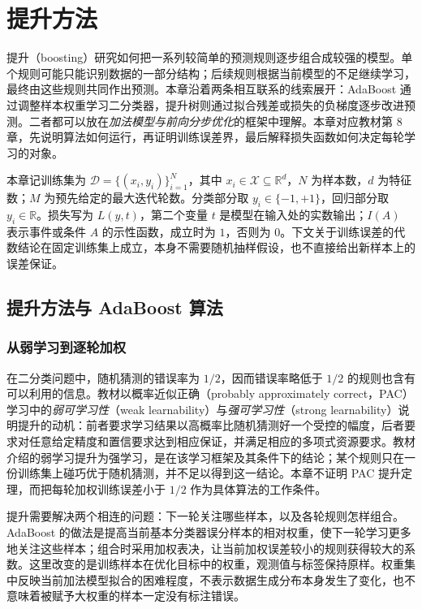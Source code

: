 \setcounter{chapter}{7} %
\chapter{提升方法}
\label{chap:lh-boosting}

提升（boosting）研究如何把一系列较简单的预测规则逐步组合成较强的模型。单个规则可能只能识别数据的一部分结构；后续规则根据当前模型的不足继续学习，最终由这些规则共同作出预测。本章沿着两条相互联系的线索展开：AdaBoost 通过调整样本权重学习二分类器，提升树则通过拟合残差或损失的负梯度逐步改进预测。二者都可以放在\emph{加法模型与前向分步优化}的框架中理解。本章对应教材第 8 章，先说明算法如何运行，再证明训练误差界，最后解释损失函数如何决定每轮学习的对象。

本章记训练集为 $\mathcal D=\{(x_i,y_i)\}_{i=1}^{N}$，其中 $x_i\in\mathcal X\subseteq\mathbb R^d$，$N$ 为样本数，$d$ 为特征数；$M$ 为预先给定的最大迭代轮数。分类部分取 $y_i\in\{-1,+1\}$，回归部分取 $y_i\in\mathbb R$。损失写为 $L(y,t)$，第二个变量 $t$ 是模型在输入处的实数输出；$I(A)$ 表示事件或条件 $A$ 的示性函数，成立时为 $1$，否则为 $0$。下文关于训练误差的代数结论在固定训练集上成立，本身不需要随机抽样假设，也不直接给出新样本上的误差保证。

\section{提升方法与 AdaBoost 算法}
\label{sec:lh-boost-adaboost}

\subsection{从弱学习到逐轮加权}
\label{subsec:lh-boost-weak-learning}

在二分类问题中，随机猜测的错误率为 $1/2$，因而错误率略低于 $1/2$ 的规则也含有可以利用的信息。教材以概率近似正确（probably approximately correct，PAC）学习中的\emph{弱可学习性}（weak learnability）与\emph{强可学习性}（strong learnability）说明提升的动机：前者要求学习结果以高概率比随机猜测好一个受控的幅度，后者要求对任意给定精度和置信要求达到相应保证，并满足相应的多项式资源要求。教材介绍的弱学习提升为强学习，是在该学习框架及其条件下的结论；某个规则只在一份训练集上碰巧优于随机猜测，并不足以得到这一结论。本章不证明 PAC 提升定理，而把每轮加权训练误差小于 $1/2$ 作为具体算法的工作条件。

提升需要解决两个相连的问题：下一轮关注哪些样本，以及各轮规则怎样组合。AdaBoost 的做法是提高当前基本分类器误分样本的相对权重，使下一轮学习更多地关注这些样本；组合时采用加权表决，让当前加权误差较小的规则获得较大的系数。这里改变的是训练样本在优化目标中的权重，观测值与标签保持原样。权重集中反映当前加法模型拟合的困难程度，不表示数据生成分布本身发生了变化，也不意味着被赋予大权重的样本一定没有标注错误。

